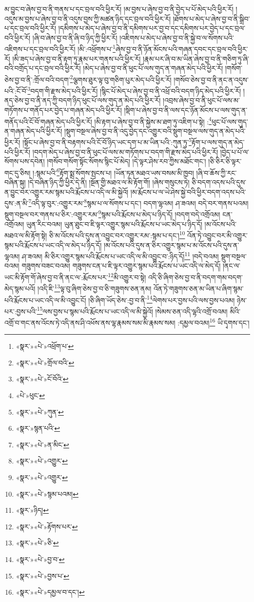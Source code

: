 མ་བྱུང་བ་ཞེས་བྱ་བ་ནི་གནས་པ་དང་བྲལ་བའི་ཕྱིར་རོ། །མ་བྱས་པ་ཞེས་བྱ་བ་ནི་བྱེད་པ་པོ་མེད་པའི་ཕྱིར་རོ། །འདུས་མ་བྱས་པ་ཞེས་བྱ་བ་ནི་འདུས་བྱས་ཀྱི་མཚན་ཉིད་དང་བྲལ་བའི་ཕྱིར་རོ། །ཐོགས་པ་མེད་པ་ཞེས་བྱ་བ་ནི་སྒྲིབ་པ་དང་བྲལ་བའི་ཕྱིར་རོ། །དམིགས་པ་མེད་པ་ཞེས་བྱ་བ་ནི་དམིགས་པར་བྱ་བ་དང་དམིགས་པར་བྱེད་པ་དང་བྲལ་བའི་ཕྱིར་རོ། །ཞི་བ་ཞེས་བྱ་བ་ནི་ཞི་བ་ཉིད་ཀྱི་ཕྱིར་རོ། །འཇིགས་པ་མེད་པ་ཞེས་བྱ་བ་ནི་སྐྱེ་བ་ལ་སོགས་པའི་འཇིགས་པ་དང་བྲལ་བའི་ཕྱིར་རོ། །མི་:འཕྲོགས་པ་\footnote{«སྣར་»«པེ་»འཕྲོག་པ་}ཞེས་བྱ་བ་ནི་ཉོན་མོངས་པའི་གཞན་དབང་དང་བྲལ་བའི་ཕྱིར་རོ། །མི་ཟད་པ་ཞེས་བྱ་བ་ནི་རྟག་ཏུ་རྣམ་པར་གནས་པའི་ཕྱིར་རོ། །རྣམ་པར་ཞི་བ་མ་ཡིན་ཞེས་བྱ་བ་ནི་གཅིག་ཏུ་ཞི་བའི་བགྲོད་པ་དང་བྲལ་བའི་ཕྱིར་རོ། །མེད་པ་ཞེས་བྱ་བ་ནི་ཕུང་པོ་ལས་གུད་ན་གཞན་མེད་པའི་ཕྱིར་རོ། །གསོག་ཅེས་བྱ་བ་ནི་:གྲོལ་བའི་བདག་\footnote{«སྣར་»«པེ་»གྲོལ་བའི་}ལྕགས་ཐུར་ལྟ་བུ་གཅིག་པུར་མེད་པའི་ཕྱིར་རོ། །གསོབ་ཅེས་བྱ་བ་ནི་ནང་ན་འདུས་པའི་:ངོ་བོ་\footnote{«སྣར་»«པེ་»ངོ་བོའི་}བདག་གི་རྫས་མེད་པའི་ཕྱིར་རོ། །སྙིང་པོ་མེད་པ་ཞེས་བྱ་བ་ནི་འཕྲོ་བའི་བདག་ཉིད་མེད་པའི་ཕྱིར་རོ། །ནད་ཅེས་བྱ་བ་ནི་ནད་ཀྱི་བདག་ཉིད་ཕུང་པོ་ལས་གུད་ན་མེད་པའི་ཕྱིར་རོ། །འབྲས་ཞེས་བྱ་བ་ནི་ཕུང་པོ་ལས་མ་གཏོགས་པ་གནོད་པར་བྱེད་པ་གཞན་མེད་པའི་ཕྱིར་རོ། །སྡིག་པ་ཞེས་བྱ་བ་ནི་ལས་དང་ཉོན་མོངས་པ་ལས་གུད་ན་གནོད་པའི་ངོ་བོ་གཞན་མེད་པའི་ཕྱིར་རོ། །མི་རྟག་པ་ཞེས་བྱ་བ་ནི་སྐྱེས་མ་ཐག་ཏུ་འཇིག་པ་སྟེ། :\footnote{«པེ་»ཕུང་}ཕུང་པོ་ལས་གུད་ན་གཞན་མེད་པའི་ཕྱིར་རོ། །སྡུག་བསྔལ་ཞེས་བྱ་བ་ནི་འདུ་བྱེད་དང་འགྱུར་བའི་སྡུག་བསྔལ་ལས་གུད་ན་མེད་པའི་ཕྱིར་རོ། །སྟོང་པ་ཞེས་བྱ་བ་ནི་བརྟགས་པའི་ངོ་བོ་ཉིད་ཡང་དག་པ་མ་ཡིན་པའི་:ཀུན་ཏུ་\footnote{«སྣར་»«པེ་»ཀུན་}རྟོག་པ་ལས་གུད་ན་མེད་པའི་ཕྱིར་རོ། །བདག་མེད་པ་ཞེས་བྱ་བ་ནི་ཕུང་པོ་ལས་མ་གཏོགས་པ་བདག་གི་རྫས་མེད་པའི་ཕྱིར་རོ། །བྱེད་པ་པོ་ལ་སོགས་པས་དབེན། །གསོབ་གསོག་སྟོང་སོགས་སྙིང་པོ་མེད། །དེ་ལྟར་ཤེས་རབ་ཀྱིས་མཐོང་གང་། །ཅི་ཅིར་ཅི་ལྟར་གང་དུ་ཅིས། །:སྙམ་པའི་\footnote{«སྣར་»སྙན་པའི་}རྟོག་སྨྲ་སོགས་སྤངས་པ། །ཡོན་ཏན་མཐའ་ཡས་བསམ་མི་ཁྱབ། །ཞི་བ་ཆོས་ཀྱི་རང་བཞིན་སྐུ། །དེ་བཞིན་ཉིད་ཀྱི་ཕྱིར་དེ་ནི། །སྔོན་གྱི་མཐའ་ལ་མི་རྟོག་གོ། །ཞེས་གསུངས་ཏེ། ཅི་བདག་འདས་པའི་དུས་ན་བྱུང་བར་འགྱུར་རམ་སྙམ་པའི་རྨོངས་པ་འདི་ལ་མི་སྐྱེའོ། །མ་རྨོངས་པ་ལ་ཡེ་ཤེས་སྐྱེ་བའི་ཕྱིར་བདག་འདས་པའི་དུས་:ན་མི་\footnote{«སྣར་»«པེ་»ན་མིང་}འདི་ལྟ་བུར་:འགྱུར་རམ་\footnote{«སྣར་»«པེ་»འགྱུར་}སྙམ་པ་ལ་སོགས་པ་དང་། བདག་ལྷའམ། ཤ་ཟའམ། བདེ་བར་གནས་པའམ། སྡུག་བསྔལ་བར་གནས་པ་ཅིར་:འགྱུར་རམ་\footnote{«སྣར་»«པེ་»འགྱུར་}སྙམ་པའི་རྨོངས་པ་མེད་པ་ཉིད་དོ། །བདག་བདེ་འགྲོའམ། ངན་འགྲོའམ། ཡུན་རིང་བའམ། ཡུན་ཐུང་བ་ཇི་ལྟར་འགྱུར་སྙམ་པའི་རྨོངས་པ་ཡང་མེད་པ་ཉིད་དོ། །མ་འོངས་པའི་མཐའ་ལ་མི་རྟོག་སྟེ། ཅི་མ་འོངས་པའི་དུས་ན་འབྱུང་བར་འགྱུར་རམ་:སྙམ་པ་དང་།\footnote{«སྣར་»«པེ་»སྙམ་པའམ།} འོན་ཏེ་འབྱུང་བར་མི་འགྱུར་སྙམ་པའི་རྨོངས་པ་ཡང་འདི་ལ་མེད་པ་ཉིད་དོ། །མ་འོངས་པའི་དུས་ན་ཅིར་འགྱུར་སྙམ་པ་མ་འོངས་པའི་དུས་ན་ལྷའམ། ཤ་ཟའམ། མི་ཅིར་འགྱུར་སྙམ་པའི་རྨོངས་པ་ཡང་འདི་ལ་མི་འབྱུང་བ་:ཉིད་དོ།\footnote{«སྣར་»ཉིད།} །བདེ་བའམ། སྡུག་བསྔལ་བའམ། གཟུགས་བཟང་བའམ། གཟུགས་ངན་པ་ཇི་ལྟར་འགྱུར་སྙམ་པའི་རྨོངས་པ་ཡང་འདི་ལ་མེད་དོ། །ནང་ལ་ཡང་མི་རྟོག་གོ་ཞེས་བྱ་བ་ནི་ནང་ལ་:རྨོངས་པར་\footnote{«སྣར་»«པེ་»རྟོགས་པར་}མི་འགྱུར་བ་སྟེ། འདི་ཅི་ཞིག་ཅེས་བྱ་བ་ནི་བདག་གམ་བདག་མེད་སྙམ་པའོ། །འདི་ཇི་\footnote{«སྣར་»«པེ་»ཅི་}ལྟ་བུ་ཞིག་ཅེས་བྱ་བ་ཅི་གཟུགས་ཅན་ནམ། འོན་ཏེ་གཟུགས་ཅན་མ་ཡིན་པ་ཞིག་སྙམ་པའི་རྨོངས་པ་ཡང་འདི་ལ་མི་འབྱུང་ངོ། །ཅི་ཞིག་ཡོད་ཅེས་:བྱ་བ་ནི་\footnote{«སྣར་»«པེ་»བྱ་བ་}ལེགས་པར་བྱས་པའི་ལས་བྱས་པའམ། ཉེས་པར་:བྱས་པའི་\footnote{«སྣར་»«པེ་»བྱས་པ་}ལས་བྱས་པ་སྙམ་པའི་རྨོངས་པ་ཡང་འདི་ལ་མི་སྐྱེའོ། །སེམས་ཅན་འདི་ལྷའི་འགྲོ་བའམ། མིའི་འགྲོ་བ་གང་ནས་འོངས་ཏེ་འདི་ནས་ཤི་འཕོས་ནས་ལྷ་རྣམས་སམ་མི་རྣམས་སམ། :དམྱལ་བའམ།\footnote{«སྣར་»«པེ་»དམྱལ་བ་དང་།} ཡི་དྭགས་དང་། 